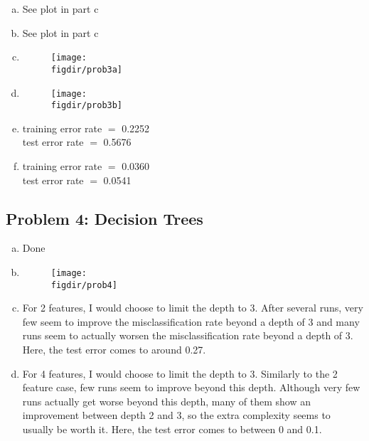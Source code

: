 \documentclass[twoside,11pt]{article}
\newcommand{\figdir}{figs}
\theoremstyle{definition}
\begin{document}
\begin{enumerate}[(a)]
	\item See plot in part c
	\item See plot in part c
	
	\item
		\begin{figure}[H] \centering
		\texttt{[image: \\figdir/prob3a]} \\
		\end{figure}
		
	\item
		\begin{figure}[H] \centering
		\texttt{[image: \\figdir/prob3b]} \\
		\end{figure}

	\item training error rate $=$ 0.2252 \\
		test error rate $=$ 0.5676
	
	\item training error rate $=$ 0.0360 \\
		test error rate $=$ 0.0541
	
\end{enumerate}



\subsection*{Problem 4: Decision Trees}

\begin{enumerate}[(a)]
	\item Done
	
	\item
		\begin{figure}[H] \centering
		\texttt{[image: \\figdir/prob4]} \\
		\end{figure}
		
	\item For 2 features, I would choose to limit the depth to 3.  After several runs, very few seem to improve the misclassification rate beyond a depth of 3 and many runs seem to actually worsen the misclassification rate beyond a depth of 3. Here, the test error comes to around 0.27.

	\item For 4 features, I would choose to limit the depth to 3.  Similarly to the 2 feature case, few runs seem to improve beyond this depth.
Although very few runs actually get worse beyond this depth, many of them show an improvement between depth 2 and 3, so the extra complexity seems to usually be worth it.  Here, the test error comes to between 0 and 0.1.

\end{enumerate}

\end{document}
